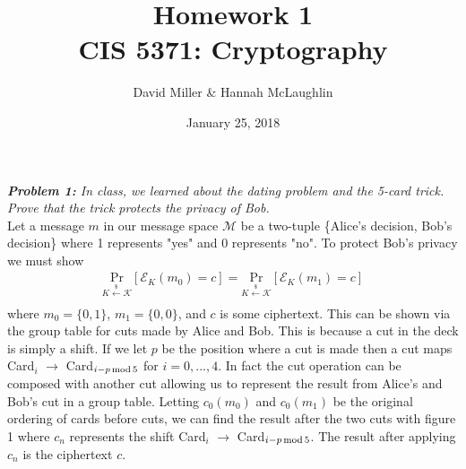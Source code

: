 \documentclass[12pt]{article}
\theoremstyle{remark}
\begin{document}
 
\title{Homework 1 \\ CIS 5371: Cryptography} 
\author{David Miller \& Hannah McLaughlin}
\date{\vspace{-.5cm} January 25, 2018}

\maketitle

\textit{\textbf{Problem 1:} In class, we learned about the dating problem and the 5-card trick. Prove that the trick protects the privacy of Bob.} \\

Let a message $m$ in our message space $\mathcal{M}$ be a two-tuple \{Alice's decision, Bob's decision\} where 1 represents "yes" and 0 represents "no". To protect Bob's privacy we must show 
\begin{align}
	\underset{K \xleftarrow[]{\$} \mathcal{K}}{\text{Pr}}[\mathcal{E}_K(m_0) = c] = 
	\underset{K \xleftarrow[]{\$} \mathcal{K}}{\text{Pr}}[\mathcal{E}_K(m_1) = c]
\end{align}
where $m_0 = \{0,1\}$, $m_1 = \{0,0\}$, and $c$ is some ciphertext. This can be shown via the group table for cuts made by Alice and Bob. This is because a cut in the deck is simply a shift. If we let $p$ be the position where a cut is made then a cut maps Card$_i$ $\rightarrow$ Card$_{i - p \hspace{.05cm} \text{mod} \hspace{.05cm} 5}$ for $i = 0, ..., 4$. In fact the cut operation can be composed with another cut allowing us to represent the result from Alice's and Bob's cut in a group table. Letting $c_0(m_0)$ and $c_0(m_1)$ be the original ordering of cards before cuts, we can find the result after the two cuts with figure 1 where $c_n$ represents the shift Card$_i$ $\rightarrow$ Card$_{i - p \hspace{.05cm} \text{mod} \hspace{.05cm} 5}$. The result after applying $c_n$ is the ciphertext $c$.
\vspace{-.1 cm}
\end{document}
